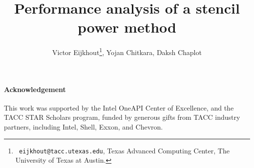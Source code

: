 \documentclass[11pt,fleqn]{artikel3}
\begin{document}
\title{Performance analysis of a stencil power method}
\author{Victor Eijkhout\thanks{{\tt
      eijkhout@tacc.utexas.edu}, Texas Advanced Computing Center, The
    University of Texas at Austin.
  }, Yojan Chitkara, Daksh Chaplot}
\maketitle



\paragraph*{Acknowledgement}
This work was supported by
the Intel OneAPI Center of Excellence, and the 
TACC STAR Scholars program,
funded by generous gifts from TACC industry partners, including Intel, Shell, Exxon, and Chevron.
\end{document}
